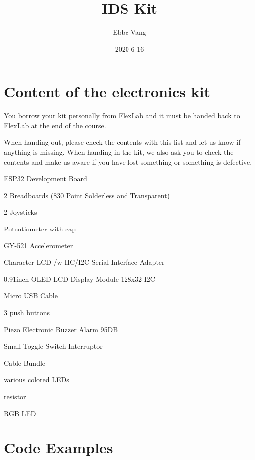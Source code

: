 \documentclass[12pt, a4paper]{article}
\date{2020-6-16}
\author{Ebbe Vang}
\title{IDS Kit}
\begin{document}
\section{Content of the electronics kit}  

You borrow your kit personally from FlexLab and it must be handed back to
FlexLab at the end of the course.

When handing out, please check the contents with this list and
let us know if anything is missing. When handing in the kit, we also ask
you to check the contents and make us aware if you
have lost something or something is defective.
\begin{todolist}
  \item ESP32 Development Board
  \item 2 Breadboards (830 Point Solderless and Transparent)
  \item 2 Joysticks
  \item Potentiometer with cap
  \item GY-521 Accelerometer 
  \item Character LCD /w IIC/I2C Serial Interface Adapter
  \item 0.91inch OLED LCD Display Module 128x32 I2C 
  \item Micro USB Cable
  \item 3 push buttons
  \item Piezo Electronic Buzzer Alarm 95DB
  \item Small Toggle Switch Interruptor
  \item Cable Bundle
  \item various colored LEDs
  \item resistor
  \item RGB LED
\end{todolist}




\newpage
\section{Code Examples}
\end{document}
